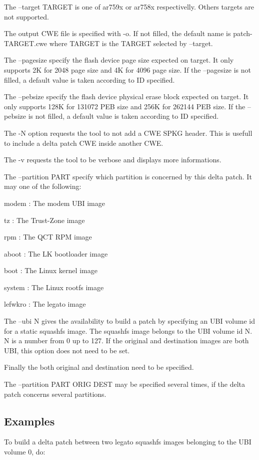 The --target T\+A\+R\+G\+ET is one of ar759x or ar758x respectivelly. Others targets are not supported.

The output C\+WE file is specified with -\/o. If not filled, the default name is patch-\/\+T\+A\+R\+G\+E\+T.\+cwe where T\+A\+R\+G\+ET is the T\+A\+R\+G\+ET selected by --target.

The --pagesize specify the flash device page size expected on target. It only supports 2K for 2048 page size and 4K for 4096 page size. If the --pagesize is not filled, a default value is taken according to ID specified.

The --pebsize specify the flash device physical erase block expected on target. It only supports 128K for 131072 P\+EB size and 256K for 262144 P\+EB size. If the --pebsize is not filled, a default value is taken according to ID specified.

The -\/N option requests the tool to not add a C\+WE S\+P\+KG header. This is usefull to include a delta patch C\+WE inside another C\+WE.

The -\/v requests the tool to be verbose and displays more informations.

The --partition P\+A\+RT specify which partition is concerned by this delta patch. It may one of the following\+:
\begin{DoxyItemize}
\item modem \+: The modem U\+BI image
\item tz \+: The Trust-\/\+Zone image
\item rpm \+: The Q\+CT R\+PM image
\item aboot \+: The LK bootloader image
\item boot \+: The Linux kernel image
\item system \+: The Linux rootfs image
\item lefwkro \+: The legato image
\end{DoxyItemize}

The --ubi N gives the availability to build a patch by specifying an U\+BI volume id for a static squashfs image. The squashfs image belongs to the U\+BI volume id N. N is a number from 0 up to 127. If the original and destination images are both U\+BI, this option does not need to be set.

Finally the both original and destination need to be specified.

The --partition P\+A\+RT O\+R\+IG D\+E\+ST may be specified several times, if the delta patch concerns several partitions.\hypertarget{Delta_Patch_mkPatch_Examples}{}\subsection{Examples}\label{Delta_Patch_mkPatch_Examples}
To build a delta patch between two legato squashfs images belonging to the U\+BI volume 0, do\+:

